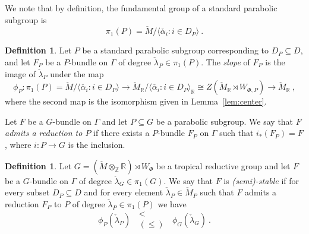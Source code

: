 \documentclass[10pt, a4paper]{amsart}
\theoremstyle{definition}
\newtheorem{definition}[theorem]{Definition}
\theoremstyle{myitemstyle}
\newcommand{\R}{\mathbb{R}}
\newcommand{\ZZ}{\mathbb{Z}}
\newcommand{\RR}{\mathbb{R}}
\newcommand{\Mcheck}{{\check{M}}}
\newcommand{\lambdacheck}{\check{\lambda}}
\newcommand{\Ga}{\Gamma}
\begin{document}
We note that by definition, the fundamental group of a standard parabolic subgroup is
\[
\pi_1(P)=\Mcheck/\langle \check{\alpha_i}: i \in D_P \rangle \ .
\]

\begin{definition} Let $P$ be a standard parabolic subgroup corresponding to $D_P\subseteq D$, and let $F_P$ be a $P$-bundle on $\Gamma$ of degree $\check{\lambda}_P \in \pi_1(P)$. The \emph{slope} of $F_P$ is the image of $\lambdacheck_P$ under the map 
\begin{equation*}
     \phi_P\colon \pi_1(P) = \Mcheck/\langle \check{\alpha_i}: i \in D_P \rangle\longrightarrow 
     \Mcheck_\R/\langle \check{\alpha_i}: i \in D_P \rangle_\RR \cong
     Z(\Mcheck_\R \rtimes W_{\Phi,P})\longrightarrow 
     \Mcheck_\R \ ,
\end{equation*}
where the second map is the isomorphism given in Lemma~\ref{lem:center}. 
\end{definition}



Let $F$ be a $G$-bundle on $\Ga$ and let $P\subseteq G$ be a parabolic subgroup. We say that $F$ \emph{admits a reduction to $P$} if there exists a $P$-bundle $F_P$ on $\Gamma$ such that $i_*(F_P)=F$, where $i:P\to G$ is the inclusion.  



\begin{definition} \label{def:slopestability}
    Let $G =  (\Mcheck\otimes_{\ZZ}\RR) \rtimes W_{\Phi}$ be a tropical reductive group and let $F$ be a $G$-bundle on $\Gamma$ of degree $\check{\lambda}_G\in \pi_1(G)$. We say that $F$ is \textit{(semi)-stable} if for every subset $D_P \subseteq D$ and for every element $\check{\lambda}_P \in \Mcheck_P$ such that $F$ admits a reduction $F_P$ to $P$ of degree $\check{\lambda}_P\in \pi_1(P)$ we have 
    \[
    \phi_P(\check{\lambda}_P) \,\,\ \substack{<\\(\leq)} \,\,\  \phi_G(\check{\lambda}_G) \ .
    \]
\end{definition}
\end{document}
